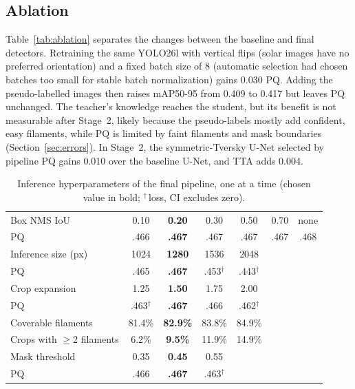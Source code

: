 \documentclass[sigconf]{acmart}
\begin{document}
\subsection{Ablation}
Table~\ref{tab:ablation} separates the changes between the baseline and final detectors. Retraining the same YOLO26l with vertical flips (solar images have no preferred orientation) and a fixed batch size of 8 (automatic selection had chosen batches too small for stable batch normalization) gains 0.030 PQ. Adding the pseudo-labelled images then raises mAP50-95 from 0.409 to 0.417 but leaves PQ unchanged. The teacher's knowledge reaches the student, but its benefit is not measurable after Stage~2, likely because the pseudo-labels mostly add confident, easy filaments, while PQ is limited by faint filaments and mask boundaries (Section~\ref{sec:errors}). In Stage~2, the symmetric-Tversky U-Net selected by pipeline PQ gains 0.010 over the baseline U-Net, and TTA adds 0.004.

\begin{table}[t]
  \caption{Inference hyperparameters of the final pipeline, one at a time (chosen value in bold; $^\dagger$\,loss, CI excludes zero).}
  \label{tab:hyper}
  \small
  \setlength{\tabcolsep}{3.5pt}
  \begin{tabular}{@{}l*{6}{c}@{}}
    \toprule
    Box NMS IoU & 0.10 & \textbf{0.20} & 0.30 & 0.50 & 0.70 & none \\
    \quad PQ & .466 & \textbf{.467} & .467 & .467 & .467 & .468 \\
    Inference size (px) & 1024 & \textbf{1280} & 1536 & 2048 & & \\
    \quad PQ & .465 & \textbf{.467} & .453$^\dagger$ & .443$^\dagger$ & & \\
    Crop expansion & 1.25 & \textbf{1.50} & 1.75 & 2.00 & & \\
    \quad PQ & .463$^\dagger$ & \textbf{.467} & .466 & .462$^\dagger$ & & \\
    \quad Coverable filaments & 81.4\% & \textbf{82.9\%} & 83.8\% & 84.9\% & & \\
    \quad Crops with $\geq$2 filaments & 6.2\% & \textbf{9.5\%} & 11.9\% & 14.9\% & & \\
    Mask threshold & 0.35 & \textbf{0.45} & 0.55 & & & \\
    \quad PQ & .466 & \textbf{.467} & .463$^\dagger$ & & & \\
    \bottomrule
  \end{tabular}
\end{table}
\end{document}
